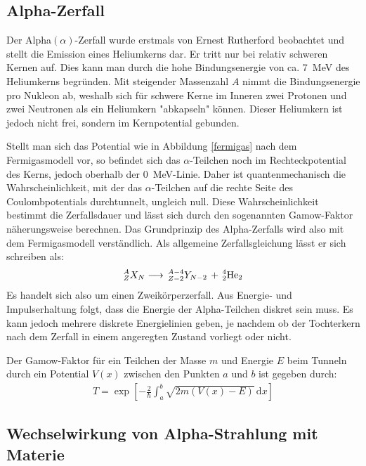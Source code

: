 \subsection{Alpha-Zerfall}

Der Alpha$(\alpha) $-Zerfall wurde erstmals von Ernest Rutherford beobachtet und stellt die Emission eines Heliumkerns dar.
Er tritt nur bei relativ schweren Kernen auf.
Dies kann man durch die hohe Bindungsenergie von ca. \SI{7}{\mega\electronvolt} des Heliumkerns begründen.
Mit steigender Massenzahl $A$ nimmt die Bindungsenergie pro Nukleon ab, weshalb sich für schwere Kerne im Inneren zwei Protonen und zwei Neutronen als ein Heliumkern "abkapseln" können.
Dieser Heliumkern ist jedoch nicht frei, sondern im Kernpotential gebunden. 

Stellt man sich das Potential wie in Abbildung \ref{fermigas} nach dem Fermigasmodell vor, so befindet sich das $\alpha$-Teilchen noch im Rechteckpotential des Kerns, jedoch oberhalb der \SI{0}{\mega\electronvolt}-Linie.
Daher ist quantenmechanisch die Wahrscheinlichkeit, mit der das $\alpha$-Teilchen auf die rechte Seite des Coulombpotentials durchtunnelt, ungleich null.
Diese Wahrscheinlichkeit bestimmt die Zerfallsdauer und lässt sich durch den sogenannten Gamow-Faktor näherungsweise berechnen.
Das Grundprinzip des Alpha-Zerfalls wird also mit dem Fermigasmodell verständlich.
Als allgemeine Zerfallsgleichung lässt er sich schreiben als:
\begin{align*}
^A_ZX_N\longrightarrow \,^{A-4}_{Z-2}Y_{N-2} \,+ \,^4_2\textnormal{He}_2
\end{align*}
Es handelt sich also um einen Zweikörperzerfall. Aus Energie- und Impulserhaltung folgt, dass die Energie der Alpha-Teilchen diskret sein muss. Es kann jedoch mehrere diskrete Energielinien geben, je nachdem ob der Tochterkern nach dem Zerfall in einem angeregten Zustand vorliegt oder nicht. 

Der Gamow-Faktor für ein Teilchen der Masse $m$ und Energie $E$ beim Tunneln durch ein Potential $V(x)$ zwischen den Punkten $a$ und $b$ ist gegeben durch:
\begin{align}
	T=\exp\left[ -\frac{2}{\hbar}\int_{a}^{b}\sqrt{2m\left( V(x)-E\right) }\,\text{d}x\right] 
\end{align}

\subsection{Wechselwirkung von Alpha-Strahlung mit Materie}

